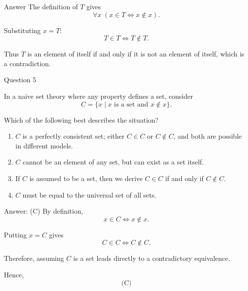 \documentclass[aspectratio=169,11pt]{beamer}
\begin{document}
\begin{frame}

\begin{block}{Answer}
The definition of $T$ gives
$$
\forall x\;(x\in T\iff x\notin x).
$$

Substituting $x=T$:
$$
T\in T\iff T\notin T.
$$

Thus $T$ is an element of itself if and only if it is not an element
of itself, which is a contradiction.
\end{block}

\end{frame}


\begin{frame}{Question 5}

In a naive set theory where any property defines a set, consider
$$
C=\{x\mid x\text{ is a set and }x\notin x\}.
$$

Which of the following best describes the situation?

\begin{enumerate}
    \item[(A)] $C$ is a perfectly consistent set; either $C\in C$ or
    $C\notin C$, and both are possible in different models.
    
    \item[(B)] $C$ cannot be an element of any set, but can exist as a
    set itself.
    
    \item[(C)] If $C$ is assumed to be a set, then we derive
    $C\in C$ if and only if $C\notin C$.
    
    \item[(D)] $C$ must be equal to the universal set of all sets.
\end{enumerate}

\end{frame}

\begin{frame}

\begin{block}{Answer: (C)}
By definition,
$$
x\in C\iff x\notin x.
$$

Putting $x=C$ gives
$$
C\in C\iff C\notin C.
$$

Therefore, assuming $C$ is a set leads directly to a contradictory
equivalence.

Hence,
$$
\boxed{\text{(C)}}
$$
\end{block}

\end{frame}
\end{document}
